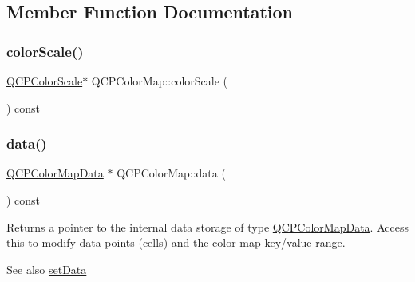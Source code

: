 \subsection{Member Function Documentation}
\mbox{\label{class_q_c_p_color_map_a9d37d08c467ac645b86fc71a3b151208}} 
\subsubsection{\texorpdfstring{color\+Scale()}{colorScale()}}
{\footnotesize\ttfamily \hyperlink{class_q_c_p_color_scale}{Q\+C\+P\+Color\+Scale}$\ast$ Q\+C\+P\+Color\+Map\+::color\+Scale (\begin{DoxyParamCaption}{ }\end{DoxyParamCaption}) const\hspace{0.3cm}{\ttfamily [inline]}}

\mbox{\label{class_q_c_p_color_map_a047d7eb3ae657f93f2f39b5e68b79451}} 
\subsubsection{\texorpdfstring{data()}{data()}}
{\footnotesize\ttfamily \hyperlink{class_q_c_p_color_map_data}{Q\+C\+P\+Color\+Map\+Data} $\ast$ Q\+C\+P\+Color\+Map\+::data (\begin{DoxyParamCaption}{ }\end{DoxyParamCaption}) const\hspace{0.3cm}{\ttfamily [inline]}}

Returns a pointer to the internal data storage of type \hyperlink{class_q_c_p_color_map_data}{Q\+C\+P\+Color\+Map\+Data}. Access this to modify data points (cells) and the color map key/value range.

\begin{DoxySeeAlso}{See also}
\hyperlink{class_q_c_p_color_map_a5a23e133a20c4ccad35fd32e6c0f9809}{set\+Data} 
\end{DoxySeeAlso}
\mbox{\label{class_q_c_p_color_map_ae478f0a5a016420d66c70cc33d6cda1d}} 

